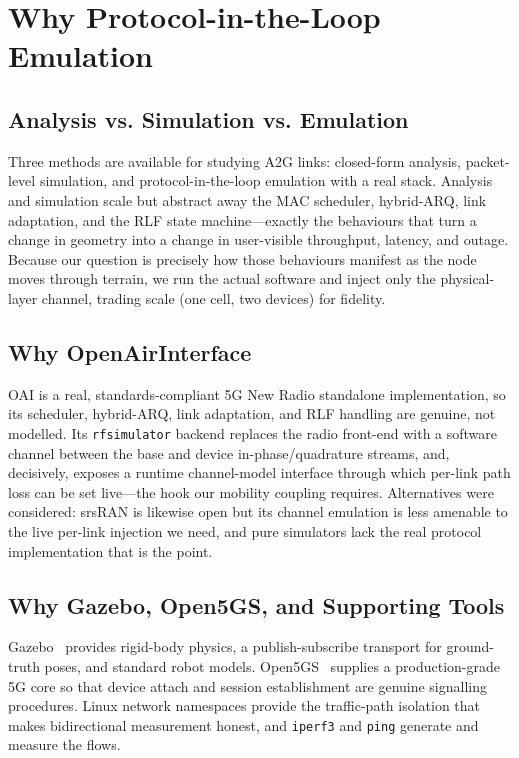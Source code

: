 \documentclass[conference]{IEEEtran}
\begin{document}
\section{Why Protocol-in-the-Loop Emulation}
\label{sec:pil}

\subsection{Analysis vs. Simulation vs. Emulation}
Three methods are available for studying A2G links: closed-form analysis,
packet-level simulation, and protocol-in-the-loop emulation with a real stack.
Analysis and simulation scale but abstract away the MAC scheduler, hybrid-ARQ, link
adaptation, and the RLF state machine---exactly the behaviours that turn a change in
geometry into a change in user-visible throughput, latency, and outage. Because our
question is precisely how those behaviours manifest as the node moves through terrain,
we run the actual software and inject only the physical-layer channel, trading scale
(one cell, two devices) for fidelity.

\subsection{Why OpenAirInterface}
OAI is a real, standards-compliant 5G New Radio standalone implementation, so its
scheduler, hybrid-ARQ, link adaptation, and RLF handling are genuine, not modelled.
Its \texttt{rfsimulator} backend replaces the radio front-end with a software channel
between the base and device in-phase/quadrature streams, and, decisively, exposes a
runtime channel-model interface through which per-link path loss can be set live---the
hook our mobility coupling requires. Alternatives were considered: srsRAN is likewise
open but its channel emulation is less amenable to the live per-link injection we
need, and pure simulators lack the real protocol implementation that is the point.

\subsection{Why Gazebo, Open5GS, and Supporting Tools}
Gazebo~\cite{koenig2004gazebo} provides rigid-body physics, a publish-subscribe transport for ground-truth
poses, and standard robot models. Open5GS~\cite{open5gs} supplies a production-grade 5G core so that
device attach and session establishment are genuine signalling procedures. Linux
network namespaces provide the traffic-path isolation that makes bidirectional
measurement honest, and \texttt{iperf3} and \texttt{ping} generate and measure the
flows.
\end{document}
